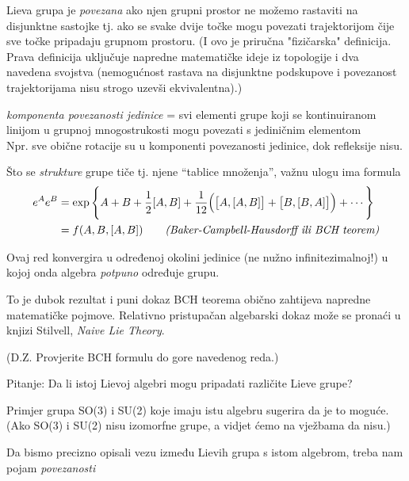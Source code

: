 \begin{definicija}[Povezanost]
Lieva grupa je \emph{povezana} ako njen grupni prostor ne možemo
rastaviti na disjunktne sastojke tj. ako se svake dvije točke 
mogu povezati trajektorijom čije sve točke pripadaju grupnom prostoru.
(I ovo je priručna "fizičarska" definicija. Prava definicija uključuje napredne
matematičke ideje iz topologije i dva navedena svojstva (nemogućnost rastava
na disjunktne podskupove i povezanost trajektorijama nisu strogo uzevši
ekvivalentna).)
\label{def:povezanost}
\end{definicija}


\emph{komponenta povezanosti jedinice} = svi elementi grupe koji se
kontinuiranom linijom u grupnoj mnogostrukosti mogu povezati s
jediničnim elementom\\
 Npr. sve obične rotacije su u komponenti povezanosti
jedinice, dok refleksije nisu.


Što se \emph{strukture} grupe tiče tj. njene ``tablice množenja'', važnu
ulogu ima formula
\begin{equation}
\begin{split}
  e^A e^B &= \exp\Bigg\{A+B+\frac{1}{2}[A,B]+\frac{1}{12}\Big(\big[A,[A,B]\big]+
 \big[B,[B,A]\big]\Big)+\cdots \Bigg\} \\
          &= f(A,B,[A,B]) \qquad \text{\emph{(Baker-Campbell-Hausdorff ili BCH teorem)}}
\end{split}
\end{equation}

Ovaj red konvergira u određenoj okolini jedinice (ne nužno infinitezimalnoj!)
u kojoj onda algebra \emph{potpuno} određuje grupu.

To je dubok rezultat i puni dokaz BCH teorema obično zahtijeva napredne matematičke
pojmove. Relativno pristupačan algebarski dokaz može se pronaći u knjizi
Stilvell, \emph{Naive Lie Theory}.

(D.Z. Provjerite BCH formulu do gore navedenog reda.)

Pitanje: Da li istoj Lievoj algebri mogu pripadati različite Lieve grupe?

Primjer grupa SO(3) i SU(2) koje imaju istu algebru sugerira da je to moguće. 
(Ako SO(3) i SU(2) nisu izomorfne grupe, a vidjet ćemo na vježbama da nisu.)

Da bismo precizno opisali vezu između Lievih grupa s istom algebrom, treba
nam pojam \emph{povezanosti}


